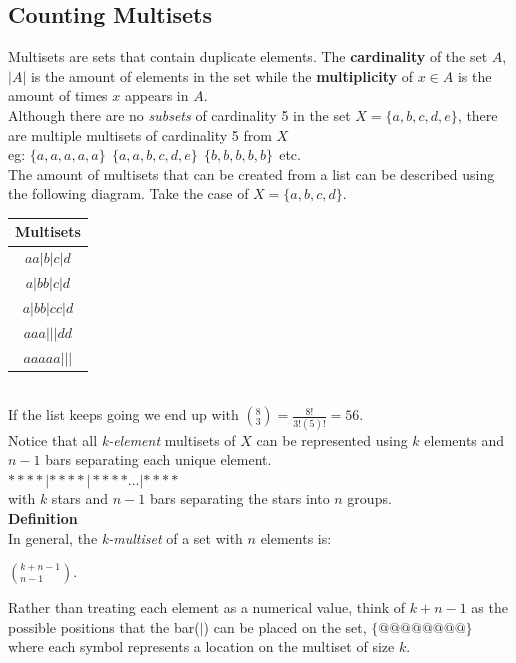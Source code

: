 \documentclass[a4paper,11pt]{article}
\begin{document}
\subsection{Counting Multisets}
Multisets are sets that contain duplicate elements. The \textbf{cardinality} of the set $A$, $|A|$ is the amount of elements in the set while
the \textbf{multiplicity} of $x \in A$ is the amount of times $x$ appears in $A$.\vspace{5pt}\\
Although there are no \textit{subsets} of cardinality 5 in the set $X=\{a, b,c, d, e\}$, there are multiple multisets of cardinality 5 from $X$\\
eg: $\{a, a, a, a, a\}~~\{a, a, b, c, d, e\}~~\{b,b,b,b,b\}~~$etc.\vspace{5pt}\\
The amount of multisets that can be created from a list can be described using the following diagram.
Take the case of $X=\{a, b, c, d\}$.\vspace{5pt}\\
\begin{tabular}{|c|}
\hline
Multisets\\
\hline
$aa|b|c|d$\\
$a|bb|c|d$\\
$a|bb|cc|d$\\
$aaa|||dd$\\
$aaaaa|||$\\
\hline
\end{tabular}\vspace{5pt}\\
If the list keeps going we end up with $(^8_3)=\frac{8!}{3!(5)!}=56$.\\
Notice that all \textit{k-element} multisets of $X$ can be represented using $k$ elements and $n-1$ bars separating each unique element.\vspace{2pt}\\
$****|****|**** \dots |****$\\
with $k$ stars and $n-1$ bars separating the stars into $n$ groups.\vspace{5pt}\\
\textbf{Definition}\\
In general, the \textit{k-multiset} of a set with $n$ elements is:
\begin{center}
$(^{k+n-1}_{n-1})$.
\end{center}
Rather than treating each element as a numerical value, think of $k+n-1$ as the possible positions that the bar($|$) can be placed on the set, $\{@@@@@@@@\}$ where each symbol represents a location on the multiset of size $k$.\vspace{5pt}\\
\end{document}
